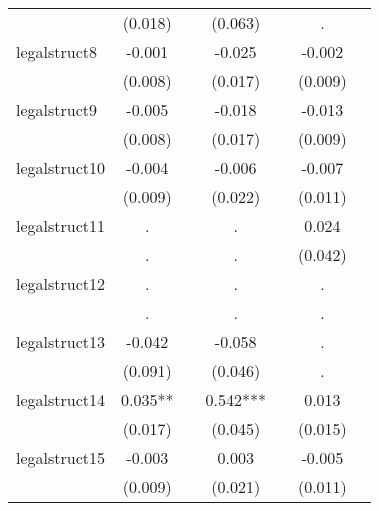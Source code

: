 {\begin{tabular}{l*{6}{c}}
            &     (0.018)   &               &     (0.063)   &               &           .   &               \\
[1em]
legalstruct8&      -0.001   &               &      -0.025   &               &      -0.002   &               \\
            &     (0.008)   &               &     (0.017)   &               &     (0.009)   &               \\
[1em]
legalstruct9&      -0.005   &               &      -0.018   &               &      -0.013   &               \\
            &     (0.008)   &               &     (0.017)   &               &     (0.009)   &               \\
[1em]
legalstruct10&      -0.004   &               &      -0.006   &               &      -0.007   &               \\
            &     (0.009)   &               &     (0.022)   &               &     (0.011)   &               \\
[1em]
legalstruct11&           .   &               &           .   &               &       0.024   &               \\
            &           .   &               &           .   &               &     (0.042)   &               \\
[1em]
legalstruct12&           .   &               &           .   &               &           .   &               \\
            &           .   &               &           .   &               &           .   &               \\
[1em]
legalstruct13&      -0.042   &               &      -0.058   &               &           .   &               \\
            &     (0.091)   &               &     (0.046)   &               &           .   &               \\
[1em]
legalstruct14&       0.035** &               &       0.542***&               &       0.013   &               \\
            &     (0.017)   &               &     (0.045)   &               &     (0.015)   &               \\
[1em]
legalstruct15&      -0.003   &               &       0.003   &               &      -0.005   &               \\
            &     (0.009)   &               &     (0.021)   &               &     (0.011)   &               \\

\end{tabular}}
